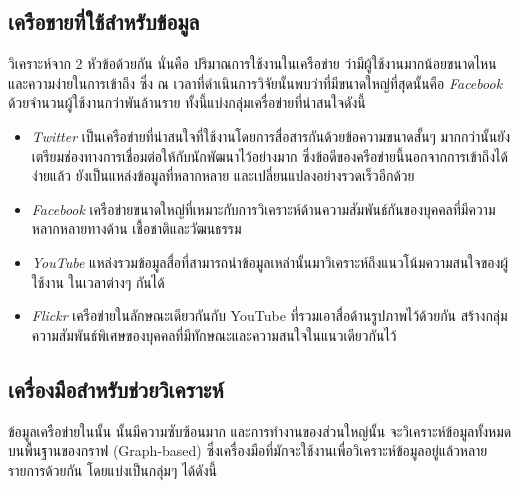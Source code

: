 \subsection{เครือขายที่ใช้สำหรับข้อมูล}
วิเคราะห์จาก 2 หัวข้อด้วยกัน นั่นคือ ปริมาณการใช้งานในเครือข่าย 
ว่ามีผู้ใช้งานมากน้อยขนาดไหน และความง่ายในการเข้าถึง ซึ่ง ณ 
เวลาที่ดำเนินการวิจัยนั้นพบว่า{\OSN}ที่มีขนาดใหญ่ที่สุดนั้นคือ \textit{Facebook} 
ด้วยจำนวนผู้ใช้งานกว่าพันล้านราย ทั้งนี้แบ่งกลุ่มเครื่อข่ายที่น่าสนใจดังนี้

\begin{itemize}
    \item \textit{Twitter} เป็นเครือข่ายที่น่าสนใจที่ใช้งานโดยการสื่อสารกันด้วยข้อความขนาดสั้นๆ 
    มากกว่านั้นยังเตรียมช่องทางการเชื่อมต่อให้กับนักพัฒนาไว้อย่างมาก ซึ่งข้อดีของครือข่ายนี้นอกจากการเข้าถึงได้ง่ายแล้ว
    ยังเป็นแหล่งข้อมูลที่หลากหลาย และเปลี่ยนแปลงอย่างรวดเร็วอีกด้วย
    
    \item \textit{Facebook} เครือข่ายขนาดใหญ่ที่เหมาะกับการวิเคราะห์ด้านความสัมพันธ์กันของบุคคลที่มีความหลากหลายทางด้าน 
    เชื้อชาติและวัฒนธรรม 

    \item \textit{YouTube} แหล่งรวมข้อมูลสื่อที่สามารถนำข้อมูลเหล่านั้นมาวิเคราะห์ถึงแนวโน้มความสนใจของผู้ใช้งาน 
    ในเวลาต่างๆ กันได้ 

    \item \textit{Flickr} เครือข่ายในลักษณะเดียวกันกับ YouTube ที่รวมเอาสื่อด้านรูปภาพไว้ด้วยกัน 
    สร้างกลุ่มความสัมพันธ์พิเศษของบุคคลที่มีทักษณะและความสนใจในแนวเดียวกันไว้
\end{itemize}

\subsection{เครื่องมือสำหรับช่วยวิเคราะห์}
ข้อมูลเครือข่ายใน{\OSN}นั้น นั้นมีความซับซ้อนมาก และการทำงานของ{\OSN}ส่วนใหญ่นั้น 
จะวิเคราะห์ข้อมูลทั้งหมดบนพื้นฐานของกราฟ (Graph-based) ซึ่งเครื่องมือที่มักจะใช้งานเพื่อวิเคราะห์ข้อมูลอยู่แล้วหลายรายการด้วยกัน
โดยแบ่งเป็นกลุ่มๆ ได้ดังนี้ 

